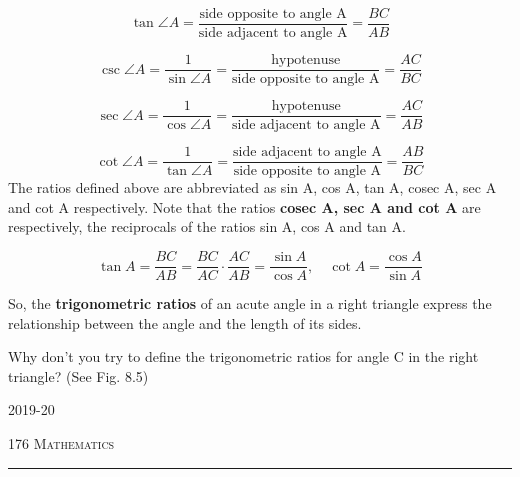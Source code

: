 \documentclass[11pt,a4paper]{article}
\begin{document}
\[
\tan \angle A = \frac{\text{side opposite to angle A}}{\text{side adjacent to angle A}} = \frac{BC}{AB}
\]

\[
\csc \angle A = \frac{1}{\sin \angle A} = \frac{\text{hypotenuse}}{\text{side opposite to angle A}} = \frac{AC}{BC}
\]

\[
\sec \angle A = \frac{1}{\cos \angle A} = \frac{\text{hypotenuse}}{\text{side adjacent to angle A}} = \frac{AC}{AB}
\]

\[
\cot \angle A = \frac{1}{\tan \angle A} = \frac{\text{side adjacent to angle A}}{\text{side opposite to angle A}} = \frac{AB}{BC}
\]
The ratios defined above are abbreviated as sin A, cos A, tan A, cosec A, sec A and cot A respectively. Note that the ratios \textbf{cosec A, sec A and cot A} are respectively, the reciprocals of the ratios sin A, cos A and tan A.

\[
\tan A = \frac{BC}{AB} = \frac{BC}{AC} \cdot \frac{AC}{AB} = \frac{\sin A}{\cos A}, \quad \cot A = \frac{\cos A}{\sin A}
\]

So, the \textbf{trigonometric ratios} of an acute angle in a right triangle express the relationship between the angle and the length of its sides.

Why don’t you try to define the trigonometric ratios for angle C in the right triangle? (See Fig. 8.5)

\vfill
\begin{center}
2019-20
\end{center}



\noindent \color{cyan} 176 \hfill \textsc{Mathematics}

\noindent \color{cyan} \rule{\linewidth}{0.5pt}

\vspace{0.5cm}
\end{document}
